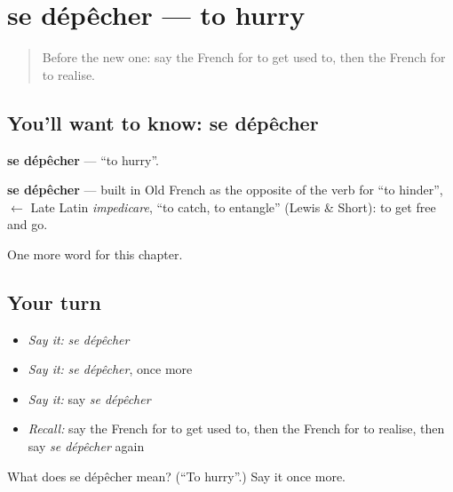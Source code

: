 \section[se dépêcher]{se dépêcher — to hurry}

\label{lesson:FR-C239-depecher}



\begin{quote}
Before the new one: say the French for to get used to, then the French for to realise.
\end{quote}

\subsection*{You'll want to know: se dépêcher}
\textbf{se dépêcher} — \textquotedblleft{}to hurry\textquotedblright{}.

\begin{cousinweb}
\textbf{se dépêcher} — built in Old French as the opposite of the verb for \textquotedblleft{}to hinder\textquotedblright{}, $\leftarrow$ Late Latin \emph{impedicare}, \textquotedblleft{}to catch, to entangle\textquotedblright{} (Lewis \& Short): to get free and go.
\end{cousinweb}

\begin{grammarlens}[title={What you've built}]
One more word for this chapter.
\end{grammarlens}

\subsection*{Your turn}
\begin{itemize}
\raggedright
  \item \emph{Say it:} \emph{se dépêcher}
  \item \emph{Say it:} \emph{se dépêcher}, once more
  \item \emph{Say it:} say \emph{se dépêcher}
  \item \emph{Recall:} say the French for to get used to, then the French for to realise, then say \emph{se dépêcher} again
\end{itemize}

\begin{tcolorbox}[breakable,colback=teal!4,colframe=teal!35!black,title={Before you move on}]
What does se dépêcher mean? (\textquotedblleft{}To hurry\textquotedblright{}.) Say it once more.
\end{tcolorbox}

